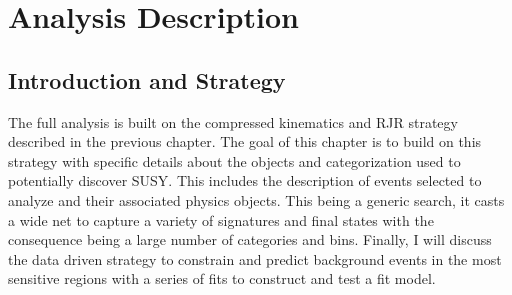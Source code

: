 
\setcounter{secnumdepth}{3}
\setcounter{tocdepth}{3}
\setlength{\parskip}{\smallskipamount}
\setlength{\parindent}{0pt}


\makeatletter


\providecommand{\tabularnewline}{\\}


\makeatother

%

\chapter{Analysis Description }

\section{Introduction and Strategy}
The full analysis is built on the compressed kinematics and RJR strategy described in the previous chapter. The goal of this chapter is to build on this strategy with specific details about the objects and categorization used to potentially discover SUSY. This includes the description of events selected to analyze and their associated physics objects. This being a generic search, it casts a wide net to capture a variety of signatures and final states with the consequence being a large number of categories and bins. Finally, I will discuss the data driven strategy to constrain and predict background events in the most sensitive regions with a series of fits to construct and test a fit model.

 
